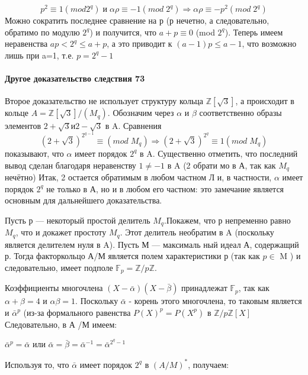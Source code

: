 
		\begin{equation}
		p^2\equiv1(mod 2^q) \;\text{и}\; \alpha\rho\equiv-1 (mod\;2^q) \Rightarrow \alpha\rho\equiv-p^2 (mod\;2^q)
		\end{equation}
		Можно сократить последнее сравнение на р (р нечетно, а следовательно, обратимо по модулю $2^q$) и получится, что $a+p \equiv0$ (mod $2^q$). Теперь имеем неравенства $ap<2^q\leqslant a+p$, а это приводит к $(a-1)p \leqslant a -1$, что возможно лишь при a=1, т.е. $p=2^q-1$

	\paragraph{Другое доказательство следствия 73}
	\noindent
	
	Второе доказательство не использует структуру кольца $\mathbb Z[\sqrt{3}]$, а	происходит в кольце $A =\mathbb Z[\sqrt{3}] /(M_q).$ Обозначим через $\alpha$ и $\beta$ соответственно образы элементов $2+\sqrt{3} и 2-\sqrt{3}$ в A. Сравнения \\
	\begin{equation}
	(2+\sqrt{3})^{2^{q-1}} \equiv (mod\;M_q) \Rightarrow (2+\sqrt{3})^{2^q} \equiv 1 (mod\;M_q)
	\end{equation}
	показывают, что $\alpha$ имеет порядок $2^q$ в A. Существенно отметить, что последний вывод сделан благодаря неравенству $1\neq-1$ в A  (2 обрати­
	мо в А, так как $M_q$ нечётно) Итак, 2 остается обратимым в любом частном Л и, в частности, $\alpha$  имеет порядок $2^q$ не только в А, но и в любом его частном: это замечание является основным для дальнейшего	доказательства.
	
	Пусть р — некоторый простой делитель $M_q$.Покажем, что р непременно равно $M_q$, что и докажет простоту $M_q$. Этот делитель необратим	в A (поскольку является делителем нуля в A). Пусть М  — максималь­
	ный идеал А, содержащий р. Тогда факторкольцо А/М является полем	характеристики р (так как $p \in$ M ) и
	следовательно, имеет подполе $\mathbb F_p = \mathbb Z/p \mathbb Z$.
	
	Коэффициенты многочлена $(X-\bar\alpha)(X-\bar\beta)$ принадлежат $\mathbb F_p$, так как  $\alpha+\beta = 4$ и $\alpha\beta=1$. Поскольку $\bar\alpha$ - корень этого многочлена, то таковым является и $\bar\alpha^p$ (из-за формального равенства $P(X)^p = P(X^p)$ в $\mathbb Z/p \mathbb Z[X]$ Следовательно, в А /М имеем:
	

	\begin{center}
		$\bar{\alpha}^p = \bar{\alpha}$ или 
		$\bar{\alpha}=\bar{\beta}=\bar{\alpha}^{-1}=\bar{\alpha}^{2^q-1}$
	\end{center}
	 Используя то, что $\bar{\alpha}$ имеет порядок $2^q$ в  $(A/M)^{*}$, получаем:
	 
